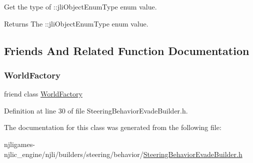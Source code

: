 Get the type of \+::jli\+Object\+Enum\+Type enum value.

\begin{DoxyReturn}{Returns}
The \+::jli\+Object\+Enum\+Type enum value. 
\end{DoxyReturn}


\subsection{Friends And Related Function Documentation}
\mbox{\label{classnjli_1_1_steering_behavior_evade_builder_acb96ebb09abe8f2a37a915a842babfac}} 
\subsubsection{\texorpdfstring{World\+Factory}{WorldFactory}}
{\footnotesize\ttfamily friend class \mbox{\hyperlink{classnjli_1_1_world_factory}{World\+Factory}}\hspace{0.3cm}{\ttfamily [friend]}}



Definition at line 30 of file Steering\+Behavior\+Evade\+Builder.\+h.



The documentation for this class was generated from the following file\+:\begin{DoxyCompactItemize}
\item 
njligames-\/njlic\+\_\+engine/njli/builders/steering/behavior/\mbox{\hyperlink{_steering_behavior_evade_builder_8h}{Steering\+Behavior\+Evade\+Builder.\+h}}\end{DoxyCompactItemize}
